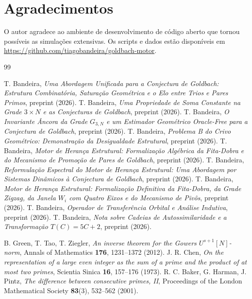 \documentclass[11pt]{article}
\begin{document}
	\section*{Agradecimentos}
	O autor agradece ao ambiente de desenvolvimento de código aberto que tornou possíveis as simulações extensivas. Os scripts e dados estão disponíveis em \url{https://github.com/tiagobandeira/goldbach-motor}.
	
	
	\begin{thebibliography}{99}
		
		 T. Bandeira, \emph{Uma Abordagem Unificada para a Conjectura de Goldbach: Estrutura Combinatória, Saturação Geométrica e o Elo entre Trios e Pares Primos}, preprint (2026).
		 T. Bandeira, \emph{Uma Propriedade de Soma Constante na Grade $3\times N$ e as Conjecturas de Goldbach}, preprint (2026).
		 T. Bandeira, \emph{O Invariante Âncora da Grade $G_{3,N}$ e um Estimador Geométrico Oracle-Free para a Conjectura de Goldbach}, preprint (2026).
		 T. Bandeira, \emph{Problema B do Crivo Geométrico: Demonstração da Desigualdade Estrutural}, preprint (2026).
		 T. Bandeira, \emph{Motor de Herança Estrutural: Formalização Algébrica da Fita-Dobra e do Mecanismo de Promoção de Pares de Goldbach}, preprint (2026).
		 T. Bandeira, \emph{Reformulação Espectral do Motor de Herança Estrutural: Uma Abordagem por Sistemas Dinâmicos à Conjectura de Goldbach}, preprint (2026).
		 T. Bandeira, \emph{Motor de Herança Estrutural: Formalização Definitiva da Fita-Dobra, da Grade Zigzag, da Janela $W_i$ com Quatro Eixos e do Mecanismo de Pivôs}, preprint (2026).
		 T. Bandeira, \emph{Operador de Transferência Orbital e Análise Indutiva}, preprint (2026).
		 T. Bandeira, \emph{Nota sobre Cadeias de Autossimilaridade e a Transformação $T(C)=5C+2$}, preprint (2026).
		
		 B. Green, T. Tao, T. Ziegler, \emph{An inverse theorem for the Gowers $U^{s+1}[N]$-norm}, Annals of Mathematics \textbf{176}, 1231–1372 (2012).
		 J. R. Chen, \emph{On the representation of a large even integer as the sum of a prime and the product of at most two primes}, Scientia Sinica \textbf{16}, 157–176 (1973).
		 R. C. Baker, G. Harman, J. Pintz, \emph{The difference between consecutive primes, II}, Proceedings of the London Mathematical Society \textbf{83}(3), 532–562 (2001).
		
	\end{thebibliography}
	
\end{document}
